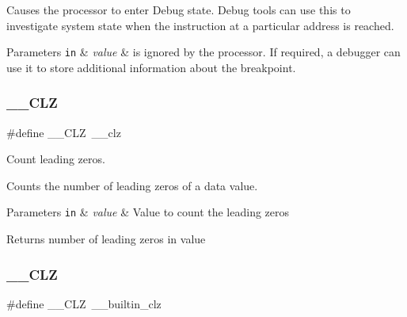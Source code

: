 Causes the processor to enter Debug state. Debug tools can use this to investigate system state when the instruction at a particular address is reached. 
\begin{DoxyParams}[1]{Parameters}
\mbox{\tt in}  & {\em value} & is ignored by the processor. If required, a debugger can use it to store additional information about the breakpoint. \\
\hline
\end{DoxyParams}
\mbox{\label{group___c_m_s_i_s___core___instruction_interface_ga5d5bb1527e042be4a9fa5a33f65cc248}} 
\subsubsection{\texorpdfstring{\+\_\+\+\_\+\+C\+LZ}{\_\_CLZ}\hspace{0.1cm}{\footnotesize\ttfamily [1/3]}}
{\footnotesize\ttfamily \#define \+\_\+\+\_\+\+C\+LZ~\+\_\+\+\_\+clz}



Count leading zeros. 

Counts the number of leading zeros of a data value. 
\begin{DoxyParams}[1]{Parameters}
\mbox{\tt in}  & {\em value} & Value to count the leading zeros \\
\hline
\end{DoxyParams}
\begin{DoxyReturn}{Returns}
number of leading zeros in value 
\end{DoxyReturn}
\mbox{\label{group___c_m_s_i_s___core___instruction_interface_ga5d5bb1527e042be4a9fa5a33f65cc248}} 
\subsubsection{\texorpdfstring{\+\_\+\+\_\+\+C\+LZ}{\_\_CLZ}\hspace{0.1cm}{\footnotesize\ttfamily [2/3]}}
{\footnotesize\ttfamily \#define \+\_\+\+\_\+\+C\+LZ~\+\_\+\+\_\+builtin\+\_\+clz}



